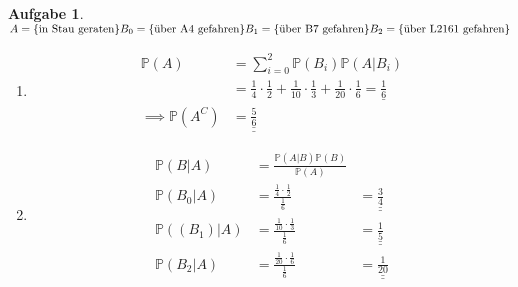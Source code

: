 \documentclass[11pt]{article}
\theoremstyle{break}
\newtheorem{task}{Aufgabe}
\begin{document}
\newpage
\begin{task}
    $A = \{\text{in Stau geraten}\}\\
    B_0 = \{\text{über A4 gefahren}\}\\
    B_1 = \{\text{über B7 gefahren}\}\\
    B_2 = \{\text{über L2161 gefahren}\}$
    \begin{enumerate}[label={(\alph*)}]
        \item \hfill\vspace{-5mm}\begin{align*}
            \mathbb{P}(A) &= \sum\limits_{i = 0}^{2} \mathbb{P}(B_i)\mathbb{P}(A\vert B_i)\\
            &= \frac{1}{4}\cdot\frac{1}{2} + \frac{1}{10}\cdot\frac{1}{3} + \frac{1}{20}\cdot\frac{1}{6} = \underline{\frac{1}{6}}\\
            \implies \mathbb{P}(A^C) &= \underline{\underline{\frac{5}{6}}}
        \end{align*}
        \item \hfill\vspace{-5mm}\begin{align*}
            \mathbb{P}(B\vert A) &= \frac{\mathbb{P}(A\vert B)\mathbb{P}(B)}{\mathbb{P}(A)}\\
            \mathbb{P}(B_0\vert A) &= \frac{\frac{1}{4}\cdot\frac{1}{2}}{\frac{1}{6}} &= \underline{\underline{\frac{3}{4}}}\\
            \mathbb{P}((B_1)\vert A) &= \frac{\frac{1}{10}\cdot\frac{1}{3}}{\frac{1}{6}} &= \underline{\underline{\frac{1}{5}}}\\
            \mathbb{P}(B_2\vert A) &= \frac{\frac{1}{20}\cdot\frac{1}{6}}{\frac{1}{6}} &= \underline{\underline{\frac{1}{20}}}
        \end{align*}
    \end{enumerate}
\end{task}
\end{document}
